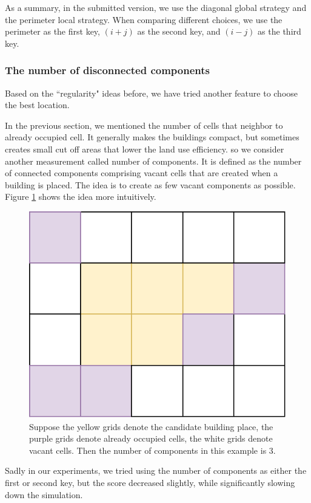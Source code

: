 As a summary, in the submitted version, we use the diagonal global strategy and the perimeter local strategy. When comparing different choices, we use the perimeter as the first key, $(i+j)$ as the second key, and $(i-j)$ as the third key.

\subsubsection{The number of disconnected components}

Based on the ``regularity" ideas before, we have tried another feature to choose the best location.

In the previous section, we mentioned the number of cells that neighbor to already occupied cell. It generally makes the buildings compact, but sometimes creates small cut off areas that lower the land use efficiency. so we consider another measurement called number of components. It is defined as the number of connected components comprising vacant cells that are created when a building is placed. The idea is to create as few vacant components as possible. Figure \ref{fig: numComponents} shows the idea more intuitively.

\begin{figure}
\center
\includegraphics[scale=0.5]{numComponents.pdf}
\caption{
Suppose the yellow grids denote the candidate building place,
the purple grids denote already occupied cells,
the white grids denote vacant cells.
Then the number of components in this example is 3.}
\label{fig: numComponents}
\end{figure}

Sadly in our experiments, we tried using the number of components as either the first or second key, but the score decreased slightly, while significantly slowing down the simulation.
